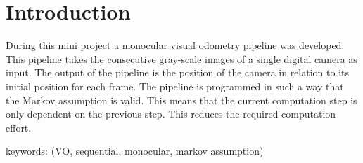 \section{Introduction}
During this mini project a monocular visual odometry pipeline was developed. This pipeline takes the consecutive gray-scale images of a single digital camera as input. 
The output of the pipeline is the position of the camera in relation to its initial position for each frame.
The pipeline is programmed in such a way that the Markov assumption is valid. This means that the current computation step is only dependent on the previous step. This reduces the required computation effort.

keywords:
(\textcolor[rgb]{0.2,0.8,0.2}{VO}, sequential,\textcolor[rgb]{0.2,0.8,0.2}{ monocular, markov assumption})